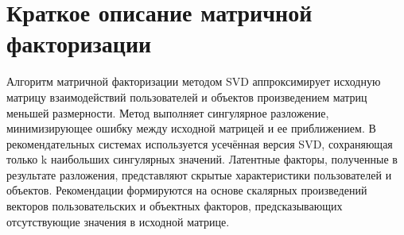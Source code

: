 \chapter{Краткое описание матричной факторизации}

Алгоритм матричной факторизации методом SVD аппроксимирует исходную матрицу взаимодействий пользователей и объектов произведением матриц меньшей размерности. Метод выполняет сингулярное разложение, минимизирующее ошибку между исходной матрицей и ее приближением. В рекомендательных системах используется усечённая версия SVD, сохраняющая только k наибольших сингулярных значений. Латентные факторы, полученные в результате разложения, представляют скрытые характеристики пользователей и объектов. Рекомендации формируются на основе скалярных произведений векторов пользовательских и объектных факторов, предсказывающих отсутствующие значения в исходной матрице.

\clearpage
